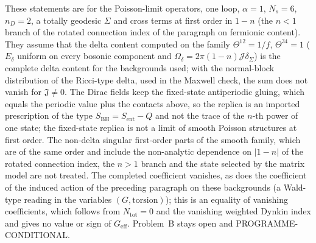 These statements are for the Poisson-limit operators, one loop, \(\alpha=1\), \(N_s=6\), \(n_D=2\), a totally geodesic \(\Sigma\) and cross terms at first order in \(1-n\) (the \(n<1\) branch of the rotated connection index of the paragraph on fermionic content). They assume that the delta content computed on the family \(\Theta^{12}=1/f\), \(\Theta^{34}=1\) (\(E_\delta\) uniform on every bosonic component and \(\Omega_\delta=2\pi(1-n)\mathcal J\delta_\Sigma\)) is the complete delta content for the backgrounds used; with the normal-block distribution of the Ricci-type delta, used in the Maxwell check, the sum does not vanish for \(\mathfrak J\neq0\). The Dirac fields keep the fixed-state antiperiodic gluing, which equals the periodic value plus the contacts above, so the replica is an imported prescription of the type \(S_{\mathrm{BH}}=S_{\mathrm{ent}}-Q\) and not the trace of the \(n\)-th power of one state; the fixed-state replica is not a limit of smooth Poisson structures at first order. The non-delta singular first-order parts of the smooth family, which are of the same order and include the non-analytic dependence on \(|1-n|\) of the rotated connection index, the \(n>1\) branch and the state selected by the matrix model are not treated. The completed coefficient vanishes, as does the coefficient of the induced action of the preceding paragraph on these backgrounds (a Wald-type reading in the variables \((G,\text{torsion})\)); this is an equality of vanishing coefficients, which follows from \(N_{\mathrm{tot}}=0\) and the vanishing weighted Dynkin index and gives no value or sign of \(G_{\mathrm{eff}}\). Problem~B stays open and PROGRAMME-CONDITIONAL.

